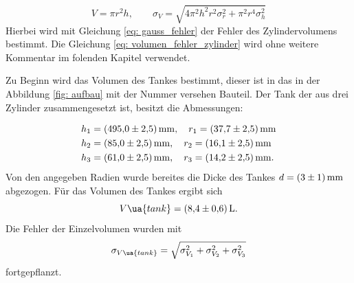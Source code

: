 \begin{equation}
  \label{eq: volumen_fehler_zylinder}
  V=\pi r^2 h, \qquad \sigma_{V}=\sqrt{4 \pi^{2} h^{2} r^{2} \sigma_{r}^{2}  + \pi^{2} r^{4} \sigma_{h}^{2} }
\end{equation}
Hierbei wird mit Gleichung \eqref{eq: gauss_fehler} der Fehler des Zylindervolumens bestimmt.
Die Gleichung \ref{eq: volumen_fehler_zylinder} wird ohne weitere Kommentar im folenden Kapitel verwendet.

Zu Beginn wird das Volumen des Tankes bestimmt, dieser ist in das in der Abbildung \ref{fig: aufbau} mit der Nummer
 versehen Bauteil.
Der Tank der aus drei Zylinder zusammengesetzt ist,  besitzt die Abmessungen:

\begin{align*}
h_1&=\SI{495 \pm 2.5}{\milli\meter}, \quad r_1=\SI{37.7\pm2.5}{\milli\meter} \\
h_2&=\SI{85 \pm 2.5}{\milli\meter}, \quad r_2=\SI{16.1\pm 2.5}{\milli\meter} \\
h_3&=\SI{61 \pm 2.5}{\milli\meter}, \quad r_3=\SI{14.2\pm 2.5}{\milli\meter}. \\
\end{align*}
Von den angegeben Radien wurde bereites die Dicke des Tankes $d=\SI{3\pm1}{\milli\meter}$ abgezogen.
Für das Volumen des Tankes ergibt sich
\begin{equation}
  \label{eq:volumen Tank}
  V\ua{tank}=\SI{8.4\pm0.6}{\litre}.
\end{equation}
Die Fehler der Einzelvolumen wurden mit
\begin{equation}
  \label{eq:fehler_addi}
  \sigma_{V\ua{tank}}=\sqrt{\sigma_{V_{1}}^{2} + \sigma_{V_{2}}^{2}+\sigma_{V_{3}}^{2}}
\end{equation}
fortgepflanzt.

